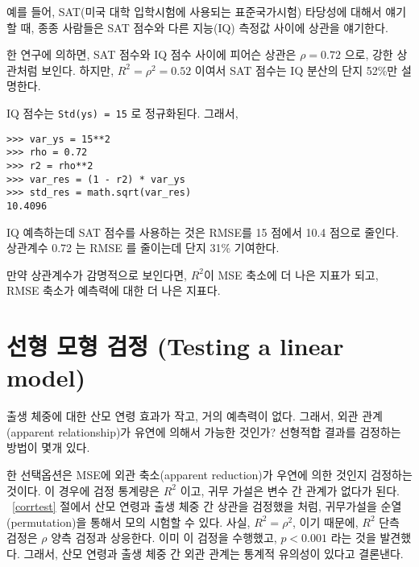 
예를 들어, SAT(미국 대학 입학시험에 사용되는 표준국가시험) 타당성에 대해서 얘기할 때, 종종 사람들은 SAT 점수와 다른 지능(IQ) 측정값 사이에 상관을 얘기한다.

한 연구에 의하면, SAT 점수와 IQ 점수 사이에 피어슨 상관은 $\rho=0.72$ 으로, 강한 상관처럼 보인다.
하지만, $R^2 = \rho^2 = 0.52$ 이여서 SAT 점수는 IQ 분산의 단지 52\%만 설명한다.

IQ 점수는 {\tt Std(ys) = 15} 로 정규화된다. 그래서, 

\begin{verbatim}
>>> var_ys = 15**2
>>> rho = 0.72
>>> r2 = rho**2
>>> var_res = (1 - r2) * var_ys
>>> std_res = math.sqrt(var_res)
10.4096
\end{verbatim}

IQ 예측하는데 SAT 점수를 사용하는 것은 RMSE를 15 점에서 10.4 점으로 줄인다. 상관계수 0.72 는 RMSE 를 줄이는데 단지 31\% 기여한다.

만약 상관계수가 감명적으로 보인다면, $R^2$이 MSE 축소에 더 나은 지표가 되고, RMSE 축소가 예측력에 대한 더 나은 지표다.



\section{선형 모형 검정 (Testing a linear model)}

출생 체중에 대한 산모 연령 효과가 작고, 거의 예측력이 없다.
그래서, 외관 관계(apparent relationship)가 유연에 의해서 가능한 것인가?
선형적합 결과를 검정하는 방법이 몇개 있다.

한 선택옵션은 MSE에 외관 축소(apparent reduction)가 우연에 의한 것인지 검정하는 것이다. 이 경우에 검정 통계량은 $R^2$ 이고, 귀무 가설은 변수 간 관계가 없다가 된다. ~\ref{corrtest} 절에서 산모 연령과 출생 체중 간 상관을 검정했을 처럼, 귀무가설을 순열(permutation)을 통해서 모의 시험할 수 있다. 사실, $R^2 = \rho^2$, 이기 때문에, $R^2$ 단측 검정은 $\rho$ 양측 검정과 상응한다. 이미 이 검정을 수행했고, $p < 0.001$ 라는 것을 발견했다. 그래서, 산모 연령과 출생 체중 간 외관 관계는 통계적 유의성이 있다고 결론낸다.



